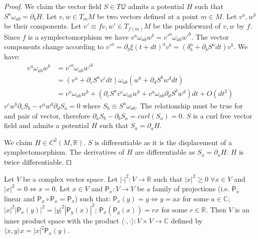 \documentclass[smallextended]{svjour3}
\numberwithin{equation}{section}
\renewenvironment{proof}{\emph{Proof}.}{\hfill\(\qed\)}
\begin{document}
\begin{proof}
	We claim the vector field $S \in T\mathcal{Q}$ admits a potential $H$ such that $S^{a} \omega_{ab} = \partial_{b}H$. Let $v, w \in T_m M$ be two vectors defined at a point $m \in M$. Let $v^a, w^b$ be their components. Let $v'\equiv f v, w' \in T_{f(m)}M$ be the pushforward of $v, w$ by $f$. Since $f$ is a symplectomorphism we have $v^{a} \omega_{ab} w^{b} = v'^{a} \omega_{ab} w'^{b}$. The vector components change according to $v'^a = \partial_b \xi(t+dt)^a v^b = (\delta^a_b + \partial_b S^a dt) v^b$. We have:
	\begin{align*}
	v^{a} \omega_{ab} w^{b} &= v'^{a} \omega_{ab} w'^{b}  \\
	&= (v^{a} + \partial_{c} S^{a} v^{c} dt) \omega_{ab} ( w^{b} + \partial_{d} S^{b} w^{d} dt) \\
	&= v^{a} \omega_{ab} w^{b} + (\partial_{c} S^{a} v^{c} \omega_{ab} w^{b} + v^{a} \omega_{ab} \partial_{d} S^{b} w^{d}) dt + O(dt^2)
	\end{align*}
	$v^{c} w^{b} \partial_{c} S_{b} - v^{a} w^{d} \partial_{d} S_{a} = 0$ where $S_{b} \equiv S^{a} \omega_{ab}$. The relationship must be true for and pair of vector, therefore $\partial_{a} S_{b} - \partial_{b} S_{a} = curl(S_{a}) = 0$. $S$ is a curl free vector field and admits a potential $H$ such that $S_{a} = \partial_{a}H$.
	
	We claim $H \in C^2(M, \mathbb{R})$. $S$ is differentiable as it is the displacement of a symplectomorphism. The derivatives of $H$ are differentiable as $S_{a} = \partial_{a}H$. $H$ is twice differentiable.
\end{proof}

\begin{thrm}\label{thrm:inner_product}
	Let $V$ be a complex vector space. Let $| \cdot | ^2 : V \rightarrow \mathbb{R}$ such that $|x|^2 \ge 0 \; \forall x \in V$ and $|x|^2 = 0 \Leftrightarrow x = 0$. Let $x \in V$ and $\mathsf{P}_x : V \rightarrow V$ be a family of projections (i.e. $\mathsf{P}_x$ linear and $\mathsf{P}_x \circ \mathsf{P}_x = \mathsf{P}_x$) such that: $\mathsf{P}_x (y) = y \Leftrightarrow y = a x$ for some $a \in \mathbb{C}$; $|x|^2|\mathsf{P}_x (y)|^2=|y|^2|\mathsf{P}_y (x)|^2$; $\mathsf{P}_x (\mathsf{P}_y (x)) = r x$ for some $r \in \mathbb{R}$.
	Then $V$ is an inner product space with the product $\langle \cdot , \cdot \rangle : V \times V \rightarrow \mathbb{C}$ defined by $\langle x , y \rangle x = |x|^2 \mathsf{P}_x (y)$.
\end{thrm}
\end{document}
